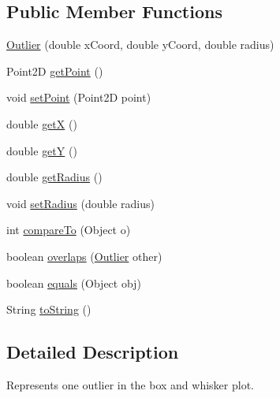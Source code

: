 \subsection*{Public Member Functions}
\begin{DoxyCompactItemize}
\item 
\mbox{\hyperlink{classorg_1_1jfree_1_1chart_1_1renderer_1_1_outlier_a7bd8103a524c046d951e330a27d28021}{Outlier}} (double x\+Coord, double y\+Coord, double radius)
\item 
Point2D \mbox{\hyperlink{classorg_1_1jfree_1_1chart_1_1renderer_1_1_outlier_a39bcfa171a0ce35407048df984dd54f4}{get\+Point}} ()
\item 
void \mbox{\hyperlink{classorg_1_1jfree_1_1chart_1_1renderer_1_1_outlier_a0ed1a867a65ba0e2cb62d35646c28b3e}{set\+Point}} (Point2D point)
\item 
double \mbox{\hyperlink{classorg_1_1jfree_1_1chart_1_1renderer_1_1_outlier_af196d7c02c6099338cb7698037cd4ca5}{getX}} ()
\item 
double \mbox{\hyperlink{classorg_1_1jfree_1_1chart_1_1renderer_1_1_outlier_a5463dba2b1374b4325c624ee3fb94b46}{getY}} ()
\item 
double \mbox{\hyperlink{classorg_1_1jfree_1_1chart_1_1renderer_1_1_outlier_acfcf85a5ced55b6d111353e2e974f822}{get\+Radius}} ()
\item 
void \mbox{\hyperlink{classorg_1_1jfree_1_1chart_1_1renderer_1_1_outlier_ab70f46de517fda671d08bd00f11b72e5}{set\+Radius}} (double radius)
\item 
int \mbox{\hyperlink{classorg_1_1jfree_1_1chart_1_1renderer_1_1_outlier_aff78452b6e3c321393b8622f960ea7fe}{compare\+To}} (Object o)
\item 
boolean \mbox{\hyperlink{classorg_1_1jfree_1_1chart_1_1renderer_1_1_outlier_a91cbc61ff7c865ce61ee533585dca5dc}{overlaps}} (\mbox{\hyperlink{classorg_1_1jfree_1_1chart_1_1renderer_1_1_outlier}{Outlier}} other)
\item 
boolean \mbox{\hyperlink{classorg_1_1jfree_1_1chart_1_1renderer_1_1_outlier_af113d6363655f14b09e01ff7e9abbcdc}{equals}} (Object obj)
\item 
String \mbox{\hyperlink{classorg_1_1jfree_1_1chart_1_1renderer_1_1_outlier_a3ad7d121f5de2766eebb032c14a7759a}{to\+String}} ()
\end{DoxyCompactItemize}


\subsection{Detailed Description}
Represents one outlier in the box and whisker plot. 

